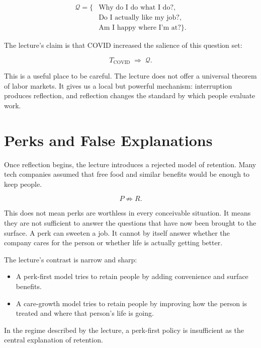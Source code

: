 \begin{align}
\mathcal{Q} = \{&
\text{Why do I do what I do?},\nonumber\\
&\text{Do I actually like my job?},\nonumber\\
&\text{Am I happy where I'm at?}\}.
\end{align}

The lecture's claim is that COVID increased the salience of this question set:

\begin{equation}
T_{\text{COVID}} \;\Rightarrow\; \mathcal{Q}.
\end{equation}

This is a useful place to be careful. The lecture does not offer a universal theorem of labor markets. It gives us a local but powerful mechanism: interruption produces reflection, and reflection changes the standard by which people evaluate work.

\section{Perks and False Explanations}

Once reflection begins, the lecture introduces a rejected model of retention. Many tech companies assumed that free food and similar benefits would be enough to keep people.

\begin{equation}
P \not\Rightarrow R .
\end{equation}

This does not mean perks are worthless in every conceivable situation. It means they are not sufficient to answer the questions that have now been brought to the surface. A perk can sweeten a job. It cannot by itself answer whether the company cares for the person or whether life is actually getting better.

The lecture's contrast is narrow and sharp:

\begin{itemize}
\item A perk-first model tries to retain people by adding convenience and surface benefits.
\item A care-growth model tries to retain people by improving how the person is treated and where that person's life is going.
\end{itemize}

\begin{proposition}
In the regime described by the lecture, a perk-first policy is insufficient as the central explanation of retention.
\end{proposition}

